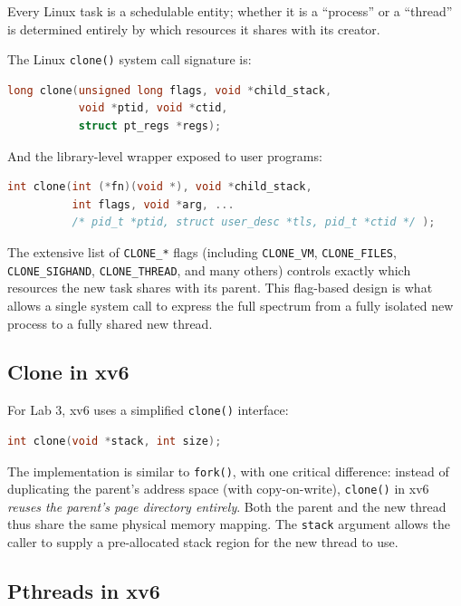 \documentclass[11pt]{article}
\begin{document}
Every Linux task is a schedulable entity; whether it is a ``process'' or a ``thread'' is determined entirely by which resources it shares with its creator.

The Linux \texttt{clone()} system call signature is:
\begin{lstlisting}[language=C, caption={Linux clone() system call}]
long clone(unsigned long flags, void *child_stack,
           void *ptid, void *ctid,
           struct pt_regs *regs);
\end{lstlisting}

And the library-level wrapper exposed to user programs:
\begin{lstlisting}[language=C, caption={Linux clone() library function}]
int clone(int (*fn)(void *), void *child_stack,
          int flags, void *arg, ...
          /* pid_t *ptid, struct user_desc *tls, pid_t *ctid */ );
\end{lstlisting}

The extensive list of \texttt{CLONE\_*} flags (including \texttt{CLONE\_VM}, \texttt{CLONE\_FILES}, \texttt{CLONE\_SIGHAND}, \texttt{CLONE\_THREAD}, and many others) controls exactly which resources the new task shares with its parent. This flag-based design is what allows a single system call to express the full spectrum from a fully isolated new process to a fully shared new thread.

\subsection{Clone in xv6}

For Lab 3, xv6 uses a simplified \texttt{clone()} interface:

\begin{lstlisting}[language=C, caption={xv6 clone() interface}]
int clone(void *stack, int size);
\end{lstlisting}

The implementation is similar to \texttt{fork()}, with one critical difference: instead of duplicating the parent's address space (with copy-on-write), \texttt{clone()} in xv6 \emph{reuses the parent's page directory entirely}. Both the parent and the new thread thus share the same physical memory mapping. The \texttt{stack} argument allows the caller to supply a pre-allocated stack region for the new thread to use.

\subsection{Pthreads in xv6}
\end{document}
